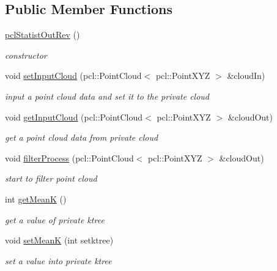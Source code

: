 \subsection*{Public Member Functions}
\begin{DoxyCompactItemize}
\item 
\hyperlink{classpclStatistOutRev_a4d49820b451f80afc9299bb1f55bf7dc}{pcl\+Statist\+Out\+Rev} ()\hypertarget{classpclStatistOutRev_a4d49820b451f80afc9299bb1f55bf7dc}{}\label{classpclStatistOutRev_a4d49820b451f80afc9299bb1f55bf7dc}

\begin{DoxyCompactList}\small\item\em constructor \end{DoxyCompactList}\item 
void \hyperlink{classpclStatistOutRev_abbc7c585c42e4546be7a9d855c8f3376}{set\+Input\+Cloud} (pcl\+::\+Point\+Cloud$<$ pcl\+::\+Point\+X\+YZ $>$ \&cloud\+In)
\begin{DoxyCompactList}\small\item\em input a point cloud data and set it to the private cloud \end{DoxyCompactList}\item 
void \hyperlink{classpclStatistOutRev_a2d86872ea28888af117d843bd906686a}{get\+Input\+Cloud} (pcl\+::\+Point\+Cloud$<$ pcl\+::\+Point\+X\+YZ $>$ \&cloud\+Out)
\begin{DoxyCompactList}\small\item\em get a point cloud data from private cloud \end{DoxyCompactList}\item 
void \hyperlink{classpclStatistOutRev_af65327fc8e4044dc4af6f6a54d053926}{filter\+Process} (pcl\+::\+Point\+Cloud$<$ pcl\+::\+Point\+X\+YZ $>$ \&cloud\+Out)
\begin{DoxyCompactList}\small\item\em start to filter point cloud \end{DoxyCompactList}\item 
int \hyperlink{classpclStatistOutRev_a8d5a0eb5e55a392a67f594f97f8a45b9}{get\+MeanK} ()
\begin{DoxyCompactList}\small\item\em get a value of private ktree \end{DoxyCompactList}\item 
void \hyperlink{classpclStatistOutRev_af92f741eead730afd7a24f8c8f8e7976}{set\+MeanK} (int setktree)
\begin{DoxyCompactList}\small\item\em set a value into private ktree \end{DoxyCompactList}\item 

\end{DoxyCompactItemize}
